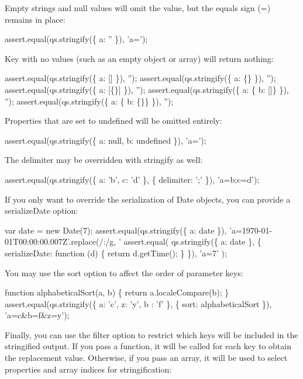 Empty strings and null values will omit the value, but the equals sign (=) remains in place\+:


\begin{DoxyCode}
assert.equal(qs.stringify(\{ a: '' \}), 'a=');
\end{DoxyCode}


Key with no values (such as an empty object or array) will return nothing\+:


\begin{DoxyCode}
assert.equal(qs.stringify(\{ a: [] \}), '');
assert.equal(qs.stringify(\{ a: \{\} \}), '');
assert.equal(qs.stringify(\{ a: [\{\}] \}), '');
assert.equal(qs.stringify(\{ a: \{ b: []\} \}), '');
assert.equal(qs.stringify(\{ a: \{ b: \{\}\} \}), '');
\end{DoxyCode}


Properties that are set to {\ttfamily undefined} will be omitted entirely\+:


\begin{DoxyCode}
assert.equal(qs.stringify(\{ a: null, b: undefined \}), 'a=');
\end{DoxyCode}


The delimiter may be overridden with stringify as well\+:


\begin{DoxyCode}
assert.equal(qs.stringify(\{ a: 'b', c: 'd' \}, \{ delimiter: ';' \}), 'a=b;c=d');
\end{DoxyCode}


If you only want to override the serialization of {\ttfamily Date} objects, you can provide a {\ttfamily serialize\+Date} option\+:


\begin{DoxyCode}
var date = new Date(7);
assert.equal(qs.stringify(\{ a: date \}), 'a=1970-01-01T00:00:00.007Z'.replace(/:/g, '%
assert.equal(
    qs.stringify(\{ a: date \}, \{ serializeDate: function (d) \{ return d.getTime(); \} \}),
    'a=7'
);
\end{DoxyCode}


You may use the {\ttfamily sort} option to affect the order of parameter keys\+:


\begin{DoxyCode}
function alphabeticalSort(a, b) \{
  return a.localeCompare(b);
\}
assert.equal(qs.stringify(\{ a: 'c', z: 'y', b : 'f' \}, \{ sort: alphabeticalSort \}), 'a=c&b=f&z=y');
\end{DoxyCode}


Finally, you can use the {\ttfamily filter} option to restrict which keys will be included in the stringified output. If you pass a function, it will be called for each key to obtain the replacement value. Otherwise, if you pass an array, it will be used to select properties and array indices for stringification\+:


